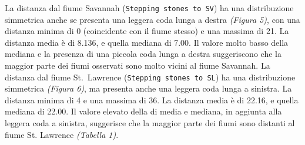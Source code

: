 \documentclass{article} %
\begin{document}
La distanza dal fiume Savannah (\texttt{Stepping stones to SV}) ha una distribuzione simmetrica anche se presenta una leggera coda lunga a destra \textit{(Figura 5)}, con una distanza minima di 0 (coincidente con il fiume stesso) e una massima di 21. La distanza media è di 8.136, e quella mediana di 7.00. Il valore molto basso della mediana e la presenza di una piccola coda lunga a destra suggeriscono che la maggior parte dei fiumi osservati sono molto vicini al fiume Savannah.
La distanza dal fiume St.\ Lawrence (\texttt{Stepping stones to SL}) ha una distribuzione simmetrica \textit{(Figura 6)}, ma presenta anche una leggera coda lunga a sinistra. La distanza minima di 4 e una massima di 36. La distanza media è di 22.16, e quella mediana di 22.00. Il valore elevato della di media e mediana, in aggiunta alla leggera coda a sinistra, suggerisce che la maggior parte dei fiumi sono distanti al fiume St. Lawrence \textit{(Tabella 1)}.
\end{document}
